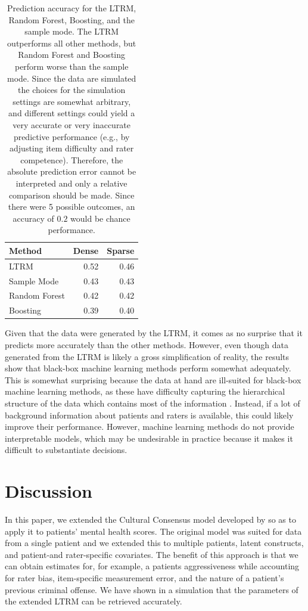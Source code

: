 \documentclass[a4paper,usenames,dvipsnames]{article}
\begin{document}
\begin{table}[!ht]
	\centering
	\caption{Prediction accuracy for the LTRM, Random Forest, Boosting, and the sample mode. The LTRM outperforms all other methods, but Random Forest and Boosting perform worse than the sample mode. Since the data are simulated the choices for the simulation settings are somewhat arbitrary, and different settings could yield a very accurate or very inaccurate predictive performance (e.g., by adjusting item difficulty and rater competence). Therefore, the absolute prediction error cannot be interpreted and only a relative comparison should be made. Since there were 5 possible outcomes, an accuracy of $0.2$ would be chance performance.}
	\begin{tabular}{lrr}
		\toprule
		Method        & Dense & Sparse \\
		\midrule
		LTRM          & 0.52  & 0.46 \\
		Sample Mode   & 0.43  & 0.43 \\
		Random Forest & 0.42  & 0.42 \\
		Boosting      & 0.39  & 0.40 \\
		\bottomrule
	\end{tabular}
\end{table}
Given that the data were generated by the LTRM, it comes as no surprise that it predicts more accurately than the other methods. However, even though data generated from the LTRM is likely a gross simplification of reality, the results show that black-box machine learning methods perform somewhat adequately. This is somewhat surprising because the data at hand are ill-suited for black-box machine learning methods, as these have difficulty capturing the hierarchical structure of the data which contains most of the information \cite<but see>{hajjem2014mixed}. Instead, if a lot of background information about patients and raters is available, this could likely improve their performance. However, machine learning methods do not provide interpretable models, which may be undesirable in practice because it makes it difficult to substantiate decisions. 
 
\section*{Discussion}

In this paper, we extended the Cultural Consensus model developed by  so as to apply it to patients' mental health scores. The original model was suited for data from a single patient and we extended this to multiple patients, latent constructs, and patient-and rater-specific covariates. The benefit of this approach is that we can obtain estimates for, for example, a patients aggressiveness while accounting for rater bias, item-specific measurement error, and the nature of a patient's previous criminal offense. We have shown in a simulation that the parameters of the extended LTRM can be retrieved accurately.
\end{document}

